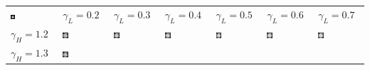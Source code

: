 \begin{tabular}{ T S @{} S @{} S @{} S @{} S @{} S }
  \centering
  \includegraphics[width=0.1\textwidth]{../images/girl}
  & $\gamma_L=0.2$ & $\gamma_L=0.3$ & $\gamma_L=0.4$ & $\gamma_L=0.5$ & $\gamma_L=0.6$ & $\gamma_L=0.7$ \\
  $\gamma_H=1.2$
  & \includegraphics[width=0.135\textwidth]{../images/girl_2_12}
  & \includegraphics[width=0.135\textwidth]{../images/girl_3_12}
  & \includegraphics[width=0.135\textwidth]{../images/girl_4_12}
  & \includegraphics[width=0.135\textwidth]{../images/girl_5_12}
  & \includegraphics[width=0.135\textwidth]{../images/girl_6_12}
  & \includegraphics[width=0.135\textwidth]{../images/girl_7_12} \\ [-4pt]
  $\gamma_H=1.3$
  & \includegraphics[width=0.135\textwidth]{../images/girl_2_13}

\end{tabular}
